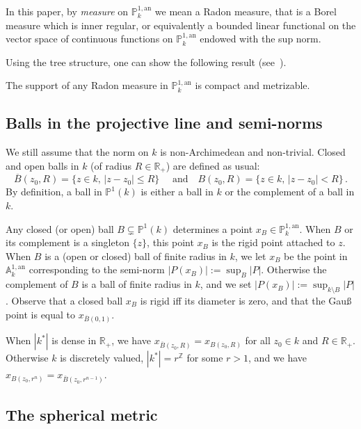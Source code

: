 \documentclass[AHL,Unicode,longabstracts]{cedram}
\newcommand{\A}{{\mathbb A}}
\newcommand{\R}{{\mathbb R}}
\newcommand{\Z}{{\mathbb Z}}
\newcommand{\an}{\mathrm{an}}
\newcommand{\PP}{\mathbb{P}}
\begin{document}
In this paper, by \emph{measure} on $\PP^{1,\an}_k$ we mean a Radon measure, that is a Borel measure which is inner regular, or equivalently a bounded linear functional on the vector space of continuous functions on $\PP^{1,\an}_k$ endowed with the sup norm.

Using the tree structure, one can show the following result (see~\cite[Lem.~7.15]{valtree}).

\begin{lemm}\label{lem:support}
The support of any Radon measure in $\PP^{1,\an}_k$ is compact and metrizable.
\end{lemm}

\subsection{Balls in the projective line and semi-norms}\label{subsec:balls}

We still assume that the norm on $k$ is non-Archimedean and non-trivial. Closed and open balls in $k$ (of radius $R \in \R_+$) are defined as usual:
\[
\overline{B}(z_0,R)= \{ z\in k, \, | z -z_0| \le R\} \quad\text{ and}\quad {B}(z_0,R)= \{ z\in k, \, | z -z_0| < R\}\,.
\]
By definition, a ball in $\PP^1(k)$ is either a ball in $k$ or the complement of a ball in $k$.

Any closed (or open) ball $B\subsetneq\PP^1(k)$ determines a point $x_B\in \PP^{1,\an}_k$. When $B$ or its complement is a singleton $\{ z\}$, this point $x_B $ is the rigid point attached to $z$. When $B$ is a (open or closed) ball of finite radius in $k$, we let $x_B$ be the point in $\A^{1,\an}_k$ corresponding to the semi-norm $|P(x_B)| := \sup_B |P|$. Otherwise the complement of $B$ is a ball of finite radius in $k$, and we set $|P(x_B)| := \sup_{k\setminus B} |P|$. Observe that a closed ball $x_B$ is rigid iff its diameter is zero, and that the Gau{\ss} point is equal to $x_{\overline{B}(0,1)}$.

\begin{rema}
When $|k^*|$ is dense in $\R_+$, we have $x_{\overline{B}(z_0,R)}=x_{B(z_0,R)}$ for all $z_0\in k$ and $R\in \R_+$. Otherwise $k$ is discretely valued, $|k^*| = r^\Z$ for some $r>1$, and we have $x_{B(z_0,r^n)}= x_{\overline{B}(z_0,r^{n-1})}$.
\end{rema}

\subsection{The spherical metric}
\end{document}

